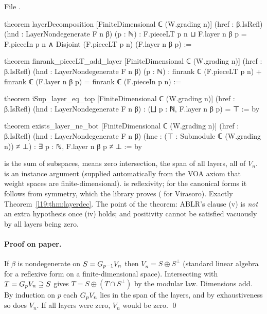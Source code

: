 \noindent File .
\begin{leancode}
theorem layerDecomposition [FiniteDimensional ℂ (W.grading n)] (href : β.IsRefl)
    (hnd : LayerNondegenerate F n β) (p : ℕ) :
    F.pieceLT p n ⊔ F.layer n β p = F.pieceIn p n ∧
      Disjoint (F.pieceLT p n) (F.layer n β p) :=

theorem finrank_pieceLT_add_layer [FiniteDimensional ℂ (W.grading n)] (href : β.IsRefl)
    (hnd : LayerNondegenerate F n β) (p : ℕ) :
    finrank ℂ (F.pieceLT p n) + finrank ℂ (F.layer n β p) = finrank ℂ (F.pieceIn p n) :=

theorem iSup_layer_eq_top [FiniteDimensional ℂ (W.grading n)] (href : β.IsRefl)
    (hnd : LayerNondegenerate F n β) : (⨆ p : ℕ, F.layer n β p) = ⊤ := by

theorem exists_layer_ne_bot [FiniteDimensional ℂ (W.grading n)] (href : β.IsRefl)
    (hnd : LayerNondegenerate F n β) (hne : (⊤ : Submodule ℂ (W.grading n)) ≠ ⊥) :
    ∃ p : ℕ, F.layer n β p ≠ ⊥ := by
\end{leancode}

\begin{dictionary}
 is the sum of subspaces,  means zero intersection,  the span of all
layers,  all of $V_n$.  is an instance argument
(supplied automatically from the VOA axiom that weight spaces are finite-dimensional).
 is reflexivity; for the canonical forms it follows from symmetry, which the library
proves (\allowbreak{}\allowbreak{}\allowbreak{} for Virasoro). Exactly
Theorem~\ref{l19:thm:layerdec}. The point of the theorem: ABLR's clause (v) is \emph{not} an extra
hypothesis once (iv) holds; and positivity cannot be satisfied vacuously by all layers being zero.
\end{dictionary}

\paragraph{Proof on paper.} If $\beta$ is nondegenerate on $S = G_{p-1}V_n$ then
$V_n = S\oplus S^\perp$ (standard linear algebra for a reflexive form on a finite-dimensional
space). Intersecting with $T = G_pV_n\supseteq S$ gives $T = S\oplus(T\cap S^\perp)$ by the
modular law. Dimensions add. By induction on $p$ each $G_pV_n$ lies in the span of the layers, and
by exhaustiveness so does $V_n$. If all layers were zero, $V_n$ would be zero. \qed


